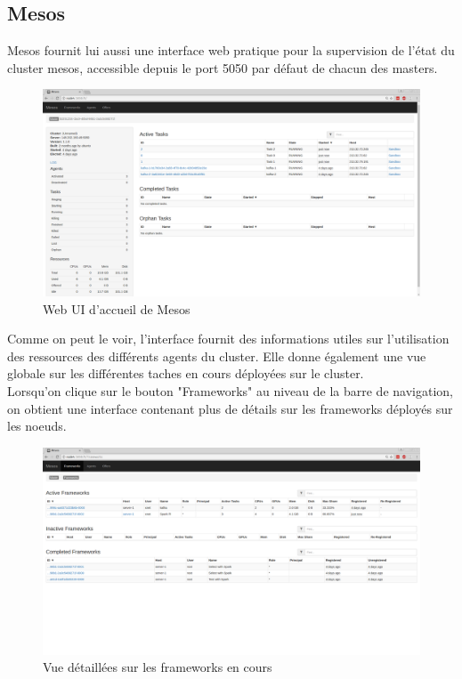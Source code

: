 \documentclass[a4paper, 11pt, titlepage]{article}
\begin{document}
\subsection{Mesos}
Mesos fournit lui aussi une interface web pratique pour la supervision de l'état du cluster mesos, accessible depuis le port 5050 par défaut de chacun des masters.
\begin{figure}[H]
    \centering
    \centerline{\includegraphics[scale=0.23]{res/mesos.png}}
    \caption{Web UI d'accueil de Mesos}
\end{figure}
Comme on peut le voir, l'interface fournit des informations utiles sur l'utilisation des ressources des différents agents du cluster. Elle donne également une vue globale sur les différentes taches en cours déployées sur le cluster. \\Lorsqu'on clique sur le bouton "Frameworks" au niveau de la barre de navigation, on obtient une interface contenant plus de détails sur les frameworks déployés sur les noeuds.
\begin{figure}[H]
    \centering
    \centerline{\includegraphics[scale=0.23]{res/fra.png}}
    \caption{Vue détaillées sur les frameworks en cours}
\end{figure}
\end{document}
